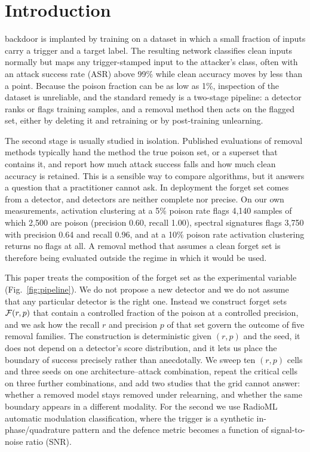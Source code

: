 \section{Introduction}
 backdoor is implanted by training on a dataset in which a
small fraction of inputs carry a trigger and a target label. The resulting
network classifies clean inputs normally but maps any trigger-stamped input to
the attacker's class, often with an attack success rate (ASR) above 99\% while
clean accuracy moves by less than a point. Because the poison fraction can be as
low as 1\%, inspection of the dataset is unreliable, and the standard remedy is
a two-stage pipeline: a detector ranks or flags training samples, and a removal
method then acts on the flagged set, either by deleting it and retraining or by
post-training unlearning.

The second stage is usually studied in isolation. Published evaluations of
removal methods typically hand the method the true poison set, or a superset
that contains it, and report how much attack success falls and how much clean
accuracy is retained. This is a sensible way to compare algorithms, but it
answers a question that a practitioner cannot ask. In deployment the forget set
comes from a detector, and detectors are neither complete nor precise. On our
own measurements, activation clustering at a 5\% poison rate flags 4{,}140
samples of which 2{,}500 are poison (precision 0.60, recall 1.00), spectral
signatures flags 3{,}750 with precision 0.64 and recall 0.96, and at a 10\%
poison rate activation clustering returns no flags at all. A removal method that
assumes a clean forget set is therefore being evaluated outside the regime in
which it would be used.

This paper treats the composition of the forget set as the experimental
variable (Fig.~\ref{fig:pipeline}). We do not propose a new detector and we do not assume that any
particular detector is the right one. Instead we construct forget sets
$\mathcal{F}(r,p)$ that contain a controlled fraction of the poison at a controlled
precision, and we ask how the recall $r$ and precision $p$ of that set govern
the outcome of five removal families. The construction is deterministic given
$(r,p)$ and the seed, it does not depend on a detector's score distribution, and
it lets us place the boundary of success precisely rather than anecdotally. We
sweep ten $(r,p)$ cells and three seeds on one architecture--attack combination,
repeat the critical cells on three further combinations, and add two studies
that the grid cannot answer: whether a removed
model stays removed under relearning, and whether the same boundary appears in a
different modality. For the second we use RadioML automatic modulation
classification, where the trigger is a synthetic in-phase/quadrature pattern and
the defence metric becomes a function of signal-to-noise ratio (SNR).

